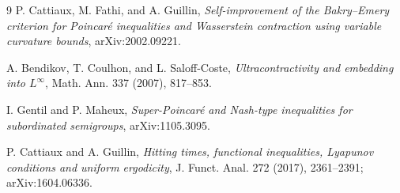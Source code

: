 \documentclass[11pt]{article}
\theoremstyle{remark}
\begin{document}
\begin{thebibliography}{9}
P. Cattiaux, M. Fathi, and A. Guillin,
\emph{Self-improvement of the Bakry--Emery criterion for Poincar\'e
inequalities and Wasserstein contraction using variable curvature bounds},
arXiv:2002.09221.

A. Bendikov, T. Coulhon, and L. Saloff-Coste,
\emph{Ultracontractivity and embedding into $L^\infty$},
Math. Ann. 337 (2007), 817--853.

I. Gentil and P. Maheux,
\emph{Super-Poincar\'e and Nash-type inequalities for subordinated
semigroups}, arXiv:1105.3095.

P. Cattiaux and A. Guillin,
\emph{Hitting times, functional inequalities, Lyapunov conditions and
uniform ergodicity}, J. Funct. Anal. 272 (2017), 2361--2391;
arXiv:1604.06336.
\end{thebibliography}
\end{document}
